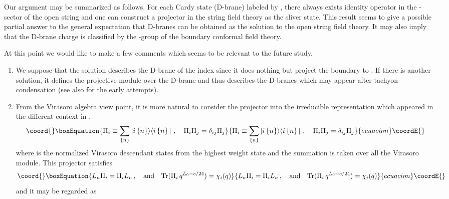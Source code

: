 \documentclass[a4paper,12pt]{article}
\begin{document}
Our argument may be summarized as follows.  For each Cardy state
(D-brane) labeled by \coordHE{},  there always exists identity
operator \coordHE{} in the \coordHE{}-\coordHE{} sector of the open string
and one can construct a projector \coordHE{} 
in the string field theory as the sliver state.
This result seems to give a possible partial 
answer to the general expectation that D-branes can be obtained as
the solution to the open string field theory.
It may also imply that the D-brane charge
is classified by the \coordHE{}-group
of the boundary conformal field theory.

At this point we would like to make a few comments
which seems to be relevant to the future study.
\begin{enumerate}
\item We suppose that the solution describes
the D-brane of the index \coordHE{}
since it does nothing but project the boundary to \coordHE{}.
If there is another solution, it defines the projective
module over the D-brane and thus describes the D-branes
which may appear after tachyon condensation \cite{r-Sen}
(see also \cite{r-hist} for the early attempts).
 \item From the Virasoro algebra view point, it is more
natural to consider the projector 
into the irreducible representation which appeared
in the different context in \cite{r-BPPZ},
\begin{equation}\coord{}\boxEquation{\label{e-proj2}
 \Pi_{i}\equiv\sum_{\left\{n\right\}}|i\left\{n
\right\}\rangle
\langle i\left\{n\right\}|\,\,,\quad
\Pi_i\Pi_j=\delta_{ij}\Pi_j
}{\Pi_{i}\equiv\sum_{\left\{n\right\}}|i\left\{n
\right\}\rangle
\langle i\left\{n\right\}|\,\,,\quad
\Pi_i\Pi_j=\delta_{ij}\Pi_j
}{ecuacion}\coordE{}\end{equation}
where \coordHE{} is the
normalized Virasoro descendant states from the highest weight state
\coordHE{} and the summation is taken over all the 
Virasoro module. This projector satisfies 
\begin{equation}\coord{}\boxEquation{
L_n \Pi_{i}=\Pi_{i} L_n\,,\quad\mbox{and}\quad
\mbox{Tr}(\Pi_i\,q^{L_0-c/24})=\chi_i(q)
}{
L_n \Pi_{i}=\Pi_{i} L_n\,,\quad\mbox{and}\quad
\mbox{Tr}(\Pi_i\,q^{L_0-c/24})=\chi_i(q)
}{ecuacion}\coordE{}\end{equation}
and it may be regarded as

\end{enumerate}
\end{document}
